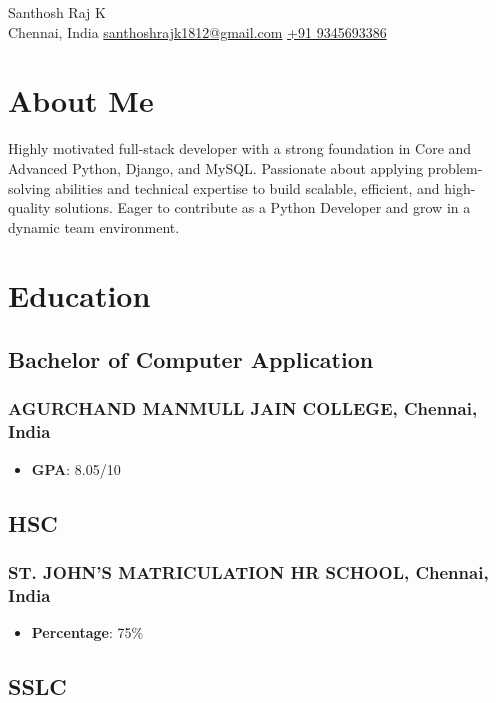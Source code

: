 \documentclass[11pt]{article}
\begin{document}
\begin{center}      
    {\fontsize{22}{22}\selectfont Santhosh Raj K} \\ 

    {\color{icnclr}\faMapMarker} Chennai, India \quad 
    {\color{icnclr}\faEnvelope[regular]} \href{mailto:santhoshrajk1812@gmail.com}{santhoshrajk1812@gmail.com} \quad
    {\color{icnclr}\Mobilefone} \href{tel:+91 9345693386}{+91 9345693386} 
\end{center}

\section{About Me}
Highly motivated full-stack developer with a strong foundation in Core and Advanced Python, Django, and MySQL.
Passionate about applying problem-solving abilities and technical expertise to build scalable, efficient, and high-quality solutions.
Eager to contribute as a Python Developer and grow in a dynamic team environment.
\section{Education}
\subsection{Bachelor of Computer Application \hfill {}}  
\subsubsection{AGURCHAND MANMULL JAIN COLLEGE, Chennai, India}
\begin{itemize}
    \item \textbf{GPA}: 8.05/10
\end{itemize}

\subsection{HSC \hfill {}}  
\subsubsection{ST. JOHN'S MATRICULATION HR SCHOOL, Chennai, India}
\begin{itemize}
    \item \textbf{Percentage}: 75\%
\end{itemize}

\subsection{SSLC \hfill {}}  
\end{document}
